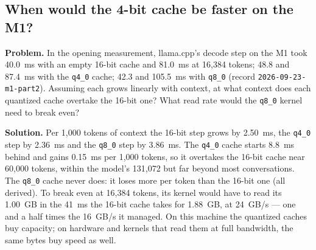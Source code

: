 \subsection{When would the 4-bit cache be faster on the M1?}
\textbf{Problem.} In the opening measurement, llama.cpp's decode step on the M1
took 40.0~ms with an empty 16-bit cache and 81.0~ms at 16,384 tokens; 48.8 and
87.4~ms with the \texttt{q4\_0} cache; 42.3 and 105.5~ms with \texttt{q8\_0}
(record \texttt{2026-09-23-m1-part2}). Assuming each grows linearly with
context, at what context does each quantized cache overtake the 16-bit one? What
read rate would the \texttt{q8\_0} kernel need to break even?

\textbf{Solution.} Per 1,000 tokens of context the 16-bit step grows by 2.50~ms,
the \texttt{q4\_0} step by 2.36~ms and the \texttt{q8\_0} step by 3.86~ms. The
\texttt{q4\_0} cache starts 8.8~ms behind and gains 0.15~ms per 1,000 tokens, so
it overtakes the 16-bit cache near 60,000 tokens, within the model's 131,072 but
far beyond most conversations. The \texttt{q8\_0} cache never does: it loses
more per token than the 16-bit one (all derived). To break even at 16,384
tokens, its kernel would have to read its 1.00~GB in the 41~ms the 16-bit cache
takes for 1.88~GB, at 24~GB/s --- one and a half times the 16~GB/s it managed.
On this machine the quantized caches buy capacity; on hardware and kernels that
read them at full bandwidth, the same bytes buy speed as well.
